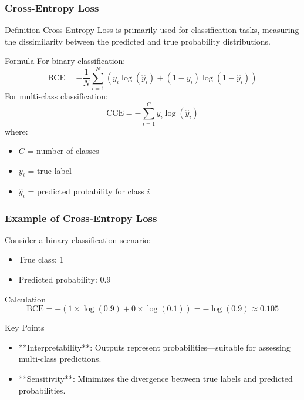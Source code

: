 \documentclass[aspectratio=169]{beamer}
\begin{document}
\begin{frame}[fragile]
  \frametitle{Cross-Entropy Loss}
  \begin{block}{Definition}
    Cross-Entropy Loss is primarily used for classification tasks, measuring the dissimilarity between the predicted and true probability distributions.
  \end{block}

  \begin{block}{Formula}
    For binary classification:
    \begin{equation}
      \text{BCE} = -\frac{1}{N} \sum_{i=1}^{N} \left( y_i \log(\hat{y}_i) + (1 - y_i) \log(1 - \hat{y}_i) \right)
    \end{equation}
    For multi-class classification:
    \begin{equation}
      \text{CCE} = -\sum_{i=1}^{C} y_i \log(\hat{y}_i)
    \end{equation}
    where:
    \begin{itemize}
      \item \( C \) = number of classes
      \item \( y_i \) = true label
      \item \( \hat{y}_i \) = predicted probability for class \( i \)
    \end{itemize}
  \end{block}
\end{frame}

\begin{frame}[fragile]
  \frametitle{Example of Cross-Entropy Loss}
  Consider a binary classification scenario:
  \begin{itemize}
    \item True class: 1
    \item Predicted probability: 0.9
  \end{itemize}
  \begin{block}{Calculation}
    \begin{equation}
      \text{BCE} = - (1 \times \log(0.9) + 0 \times \log(0.1)) = -\log(0.9) \approx 0.105
    \end{equation}
  \end{block}

  \begin{block}{Key Points}
    \begin{itemize}
      \item **Interpretability**: Outputs represent probabilities—suitable for assessing multi-class predictions.
      \item **Sensitivity**: Minimizes the divergence between true labels and predicted probabilities.
    \end{itemize}
  \end{block}
\end{frame}
\end{document}
